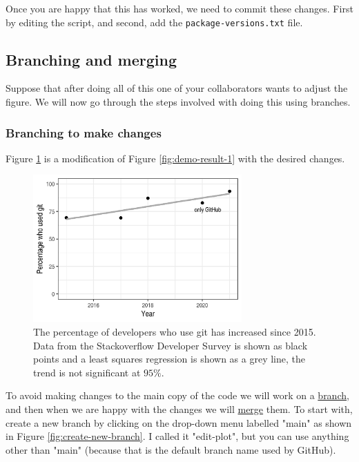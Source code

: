 \documentclass[11pt,onecolumn]{scrartcl}
\begin{document}
Once you are happy that this has worked, we need to commit these changes. First
by editing the script, and second, add the \texttt{package-versions.txt} file.

\subsection{Branching and merging}
\label{sec:orgcd375b2}

Suppose that after doing all of this one of your collaborators wants to adjust
the figure. We will now go through the steps involved with doing this using
branches.

\subsubsection*{Branching to make changes}
\label{sec:org6f59679}

Figure \ref{fig:demo-result-2} is a modification of Figure \ref{fig:demo-result-1} with the
desired changes.

\begin{figure}[htbp]
\centering
\includegraphics[width=8cm]{./git-usage-2.png}
\caption{\label{fig:demo-result-2}The percentage of developers who use git has increased since 2015. Data from the Stackoverflow Developer Survey is shown as black points and a least squares regression is shown as a grey line, the trend is not significant at \(95\%\).}
\end{figure}

To avoid making changes to the main copy of the code we will work on a \hyperref[sec:org6251582]{branch},
and then when we are happy with the changes we will \hyperref[sec:orgd1289e1]{merge} them. To start with,
create a new branch by clicking on the drop-down menu labelled "main" as shown
in Figure \ref{fig:create-new-branch}. I called it "edit-plot", but you can use
anything other than "main" (because that is the default branch name used by
GitHub).
\end{document}
